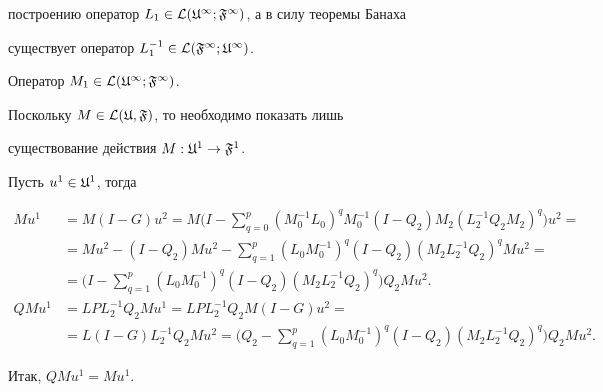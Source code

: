 построению оператор $L_1\in\cal L(\frak U^1;\frak F^1)$, а в силу теоремы Банаха 


существует оператор $L_1^{-1}\in\cal L(\frak F^1;\frak U^1)$. 


 




\begin{lems} Оператор $M_1\in\cal L(\frak U^1;\frak F^1)$. 


\end{lems} 


 


\begin{pf} Поскольку $M\in\cal L(\frak U,\frak F)$, то необходимо показать лишь 


существование действия $M:\frak U^1\to\frak F^1$. 


 


Пусть $u^1\in\frak U^1$, тогда 


\begin{align*} 


Mu^1 &= M(I-G)u^2=M\biggl(I-\sum^p_{q=0}(M_0^{-1}L_0)^q 


M_0^{-1}(I-Q_2)M_2(L_2^{-1}Q_2M_2)^q\biggr)u^2 = \\ 


% 


&= Mu^2-(I-Q_2)Mu^2-\sum^p_{q=1}(L_0M_0^{-1})^q(I-Q_2) 


(M_2L_2^{-1}Q_2)^qMu^2= \\ 


% 


&=\biggl(I-\sum^p_{q=1}(L_0M_0^{-1})^q(I-Q_2)(M_2L_2^{-1}Q_2)^q 


\biggr)Q_2Mu^2.\\ 


% 


QMu^1 &= LPL_2^{-1}Q_2Mu^1=LPL_2^{-1}Q_2M(I-G)u^2= \\ 


% 


&= L(I-G)L_2^{-1}Q_2Mu^2=\biggl(Q_2-\sum^p_{q=1}(L_0M_0^{-1})^q 


(I-Q_2)(M_2L_2^{-1}Q_2)^q\biggr)Q_2Mu^2. 


\end{align*} 


Итак, $QMu^1=Mu^1$. 


\end{pf} 


 


